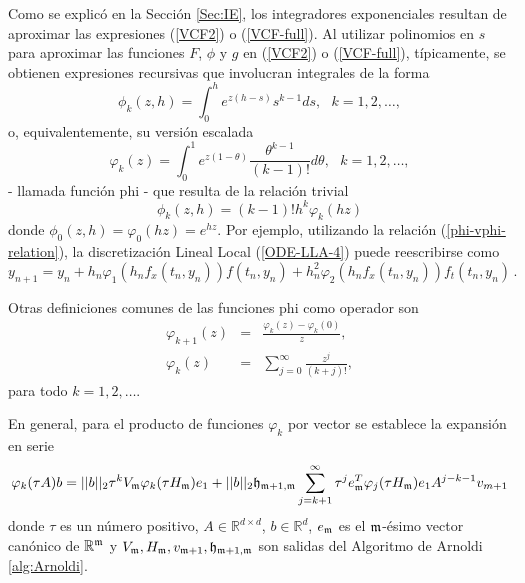 Como se explicó en la Sección \ref{Sec:IE}, los integradores exponenciales resultan de aproximar las expresiones (\ref{VCF2}) o (\ref{VCF-full}). Al utilizar polinomios en $s$ para aproximar las funciones $F$, $\phi$ y $g$ en (\ref{VCF2}) o (\ref{VCF-full}), típicamente, se obtienen expresiones recursivas que involucran integrales de la forma
\begin{equation*}
\phi _{k}(z,h)=\int_{0}^{h}e^{z(h-s)}s^{k-1}ds,\text{ \ \ \ \ \ \ \ }%
k=1,2,\ldots ,
\end{equation*}%
o, equivalentemente, su versión escalada
\begin{equation*}
\varphi _{k}(z)=\int_{0}^{1}e^{z(1-\theta )}\frac{\theta ^{k-1}}{(k-1)!}%
d\theta ,\text{ \ \ \ \ \ \ \ }k=1,2,\ldots ,
\end{equation*}%
- llamada función phi - que resulta de la relación trivial 
\begin{equation}
	\phi _{k}(z,h)=(k-1)!h^{k}\varphi_{k}(hz) \label{phi-vphi-relation}
\end{equation} 
donde $\phi _{0}(z,h)=\varphi _{0}(hz)=e^{hz}$. Por ejemplo, utilizando la relación (\ref{phi-vphi-relation}), la discretización Lineal Local (\ref{ODE-LLA-4})
puede reescribirse como
\begin{equation}
		y_{n+1}=y_{n}+h_n\varphi_1(h_nf_x(t_n,y_n))f(t_n,y_n) + h_n^2\varphi_2(h_nf_x(t_n,y_n))f_t(t_n,y_n)  \, . 
\end{equation}


Otras definiciones comunes de las funciones phi como operador son \cite{Saad92}
\begin{eqnarray}\label{phi-definition}
\varphi_{k+1}(z) &=& \frac{\varphi_k(z)-\varphi_k(0)}{z}, \label{DEF-PHI}\\
\varphi_k(z) & = &\sum\limits_{j=0}^{\infty}\frac{z^{j}}{(k+j)!}, \nonumber 
\end{eqnarray}
para todo $k=1,2,\ldots$.

En general, para el producto de funciones $\varphi_k$ por vector se establece la expansión en serie \cite{Saad92,sidje1998expokit}
\begin{equation} \label{PHI-EXPANSION}
	\varphi_k(\tau A)b=||b||_2\tau^{k} V_{\mathfrak{m}} \varphi_k(\tau H_{\mathfrak{m}})e_1 + ||b||_2\mathfrak{h}_{\mathfrak{m}+1,\mathfrak{m}}
	\sum_{j=k+1}^{\infty}\tau^{j} e_{\mathfrak{m}}^T\varphi_j(\tau H_{\mathfrak{m}})e_1A^{j-k-1}v_{m+1}
\end{equation}
donde $\tau$ es un número positivo, $A\in\mathbb{R}^{d\times d}$, $b\in\mathbb{R}^d$, $e_{\mathfrak{m}}$ es el $\mathfrak{m}$-ésimo vector canónico de $\mathbb{R}^{\mathfrak{m}}$ y $V_{\mathfrak{m}},H_{\mathfrak{m}},v_{\mathfrak{m}+1},\mathfrak{h}_{\mathfrak{m}+1,\mathfrak{m}}$ son salidas del Algoritmo de Arnoldi \ref{alg:Arnoldi}.

